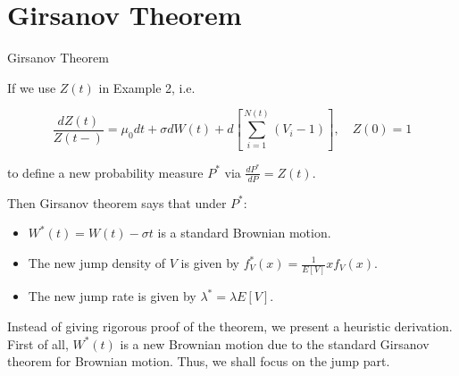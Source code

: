 \documentclass{beamer}
\begin{document}
\section{Girsanov Theorem}
\begin{frame}{Girsanov Theorem}

    {\footnotesize \footnotesize
    \par If we use \( Z(t) \) in Example 2, i.e.

\[
\frac{dZ(t)}{Z(t-)} = \mu_0 dt + \sigma dW(t) + d \left[ \sum_{i=1}^{N(t)} (V_i - 1) \right], \quad Z(0) = 1
\]

\par to define a new probability measure \( P^* \) via $\frac{dP^*}{dP} = Z(t).$ 
\par  \pause Then Girsanov theorem says that under \( P^* \):
\begin{itemize}
    \item $W^*(t) = W(t) - \sigma t$ is a standard Brownian motion.
    \item The new jump density of \( V \) is given by $f_V^*(x) = \frac{1}{E[V]} x f_V(x)$.
    \item The new jump rate is given by $\lambda^* = \lambda E[V]$.
\end{itemize}
\vspace{1em}
\par  \pause Instead of giving rigorous proof of the theorem, we present a heuristic derivation. 
First of all, \( W^*(t) \) is a new Brownian motion due to the standard Girsanov theorem for Brownian motion. Thus, we shall focus on the jump part.
    }
    
\end{frame}
\end{document}
